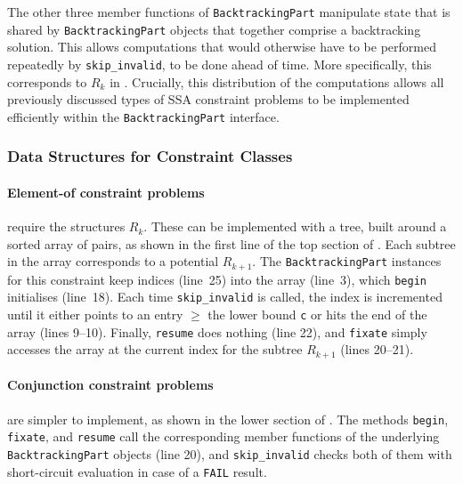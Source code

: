     The other three member functions of \texttt{BacktrackingPart} manipulate
    state that is shared by \texttt{BacktrackingPart} objects
    that together comprise a backtracking solution.
    This allows computations that would otherwise have to be performed
    repeatedly by \texttt{skip\_invalid}, to be done ahead of time.
    More specifically, this corresponds to $R_k$ in
    .
    Crucially, this distribution of the computations allows all previously
    discussed types of SSA constraint problems to be implemented efficiently
    within the {\tt BacktrackingPart} interface.

\subsubsection{Data Structures for Constraint Classes}

    \paragraph*{Element-of constraint problems} require the structures $R_k$.
    These can be implemented with a tree, built around a sorted array of pairs,
    as shown in the first line of the top section of .
    Each subtree in the array corresponds to a potential $R_{k+1}$.
    The {\tt BacktrackingPart} instances for this constraint keep indices
    (line~25) into
    the array (line~3), which {\tt begin} initialises (line~18).
    Each time {\tt skip\_invalid} is called, the index is incremented until
    it either points to an entry $\geq$ the lower bound {\tt c} or hits the
    end of the array (lines 9--10).
    Finally, {\tt resume} does nothing (line 22), and {\tt fixate} simply
    accesses the array at the current index for the subtree $R_{k+1}$
    (lines 20--21).

    \paragraph*{Conjunction constraint problems} are simpler to implement, as
    shown in the lower section of .
    The methods {\tt begin}, {\tt fixate}, and {\tt resume} call the
    corresponding member functions of the underlying {\tt BacktrackingPart}
    objects (line 20), and \texttt{skip\_invalid} checks both of them with
    short-circuit evaluation in case of a {\tt FAIL} result.

